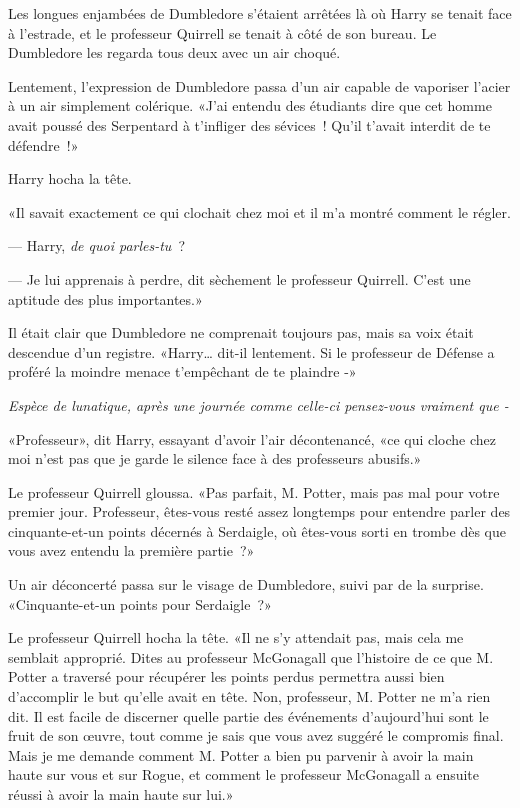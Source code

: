 Les longues enjambées de Dumbledore s'étaient arrêtées là où Harry se tenait face à l'estrade, et le professeur Quirrell se tenait à côté de son bureau. Le Dumbledore les regarda tous deux avec un air choqué.

Lentement, l'expression de Dumbledore passa d'un air capable de vaporiser l'acier à un air simplement colérique. «J'ai entendu des étudiants dire que cet homme avait poussé des Serpentard à t'infliger des sévices~! Qu'il t'avait interdit de te défendre~!»

Harry hocha la tête.

«Il savait exactement ce qui clochait chez moi et il m'a montré comment le régler.

--- Harry, \emph{de quoi parles-tu}~?

--- Je lui apprenais à perdre, dit sèchement le professeur Quirrell. C'est une aptitude des plus importantes.»

Il était clair que Dumbledore ne comprenait toujours pas, mais sa voix était descendue d'un registre. «Harry… dit-il lentement. Si le professeur de Défense a proféré la moindre menace t'empêchant de te plaindre -»

\emph{Espèce de lunatique, après une journée comme celle-ci pensez-vous vraiment que -}

«Professeur», dit Harry, essayant d'avoir l'air décontenancé, «ce qui cloche chez moi n'est pas que je garde le silence face à des professeurs abusifs.»

Le professeur Quirrell gloussa. «Pas parfait, M. Potter, mais pas mal pour votre premier jour. Professeur, êtes-vous resté assez longtemps pour entendre parler des cinquante-et-un points décernés à Serdaigle, où êtes-vous sorti en trombe dès que vous avez entendu la première partie~?»

Un air déconcerté passa sur le visage de Dumbledore, suivi par de la surprise. «Cinquante-et-un points pour Serdaigle~?»

Le professeur Quirrell hocha la tête. «Il ne s'y attendait pas, mais cela me semblait approprié. Dites au professeur McGonagall que l'histoire de ce que M. Potter a traversé pour récupérer les points perdus permettra aussi bien d'accomplir le but qu'elle avait en tête. Non, professeur, M. Potter ne m'a rien dit. Il est facile de discerner quelle partie des événements d'aujourd'hui sont le fruit de son œuvre, tout comme je sais que vous avez suggéré le compromis final. Mais je me demande comment M. Potter a bien pu parvenir à avoir la main haute sur vous et sur Rogue, et comment le professeur McGonagall a ensuite réussi à avoir la main haute sur lui.»

